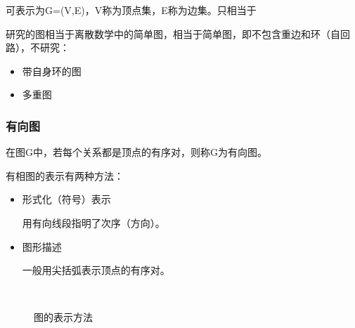 \documentclass[AutoFakeBold]{LZUThesis2007}
\begin{document}
可表示为G=(V,E)，V称为顶点集，E称为边集。只相当于

研究的图相当于离散数学中的简单图，相当于简单图，即不包含重边和环（自回路），不研究：
				
				\begin{itemize}
					\item 带自身环的图
					\item 多重图
				\end{itemize}
			\subsubsection{有向图}

在图G中，若每个关系都是顶点的有序对，则称G为有向图。

有相图的表示有两种方法：
\begin{itemize}
	\item 形式化（符号）表示

用有向线段指明了次序（方向）。
	\item 图形描述

一般用尖括弧表示顶点的有序对。
\end{itemize}
\begin{figure}[H]
	\centering
	\qquad
	\\
    \caption{图的表示方法}
    \label{fig_ide}
\end{figure}
\end{document}
